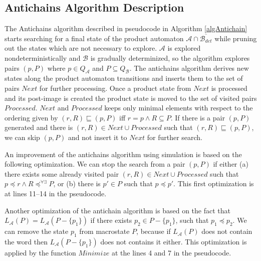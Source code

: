 \subsection{Antichains Algorithm Description}
The Antichains algorithm \cite{cav06} described in pseudocode in Algorithm \ref{algAntichain} 
starts searching for a final state of the product automaton $\mathcal{A}\cap \overline{\mathcal{B}_{det}}$ while
pruning out the states which are not necessary to explore. $\mathcal{A}$ is explored nondeterministically and $\mathcal{B}$ 
is gradually determinized, so the algorithm explores pairs $(p,P)$ where $p\in Q_\mathcal{A}$ and $P \subseteq Q_\mathcal{B}$. 
The antichains algorithm derives new states along the product automaton transitions and inserts them to the set of pairs $Next$ for further processing. 
Once a product state from $Next$ is processed and its post-image is created the product state is moved to the set of visited pairs $Processed$.
$Next$ and $Processed$ keeps only minimal elements with respect to the ordering given by $(r,R)\sqsubseteq (p,P)$ iff $r=p \wedge R \subseteq P$. 
If there is a pair $(p,P)$ generated and there is 
$(r,R)\in Next\cup Processed$ such that $(r,R) \sqsubseteq (p,P)$, we can skip $(p,P)$ and not insert it to $Next$ for further search.
 
An improvement of the antichains algorithm using simulation \cite{tacas10} is based on the following optimization. 
We can stop the search from a pair $(p,P)$ if either (a) there exists some already visited pair $(r,R) \in Next\cup Processed$ 
such that $p\preceq r \wedge R\preceq^{\forall\exists}P$, 
or (b) there is $p' \in P$ such that $p \preceq p'$. This first
optimization is at lines 11--14 in the pseudocode.

Another optimization \cite{tacas10} of the antichain algorithm is based on the fact 
that $L_\mathcal{A}(P)=L_\mathcal{A}(P-\{p_1\})$ if there exists $p_2 \in P-\{p_1\}$, such that $p_1 \preceq p_2$. We can remove the state $p_1$ 
from macrostate $P$, because if $L_\mathcal{A}(P)$ does not contain the word 
then $L_\mathcal{A}(P-\{p_1\})$ does not contains it either. This optimization is applied by the function $Minimize$ at
the lines 4 and 7 in the pseudocode.

